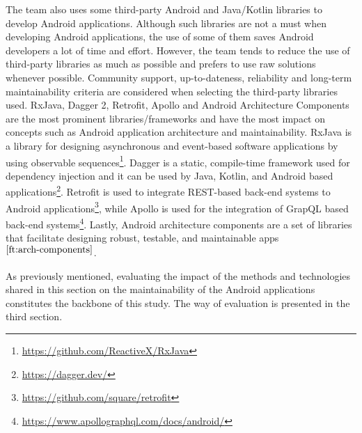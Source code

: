 The team also uses some third-party Android and Java/Kotlin libraries to develop Android applications. Although such libraries are not a must when developing Android applications, the use of some of them saves Android developers a lot of time and effort. However, the team tends to reduce the use of third-party libraries as much as possible and prefers to use raw solutions whenever possible. Community support, up-to-dateness, reliability and long-term maintainability criteria are considered when selecting the third-party libraries used. RxJava, Dagger 2, Retrofit, Apollo and Android Architecture Components are the most prominent libraries/frameworks and have the most impact on concepts such as Android application architecture and maintainability. RxJava is a library for designing asynchronous and event-based software applications by using observable sequences\footnote{\url{https://github.com/ReactiveX/RxJava}}. Dagger is a static, compile-time framework used for dependency injection and it can be used by Java, Kotlin, and Android based applications\footnote{\url{https://dagger.dev/}}. Retrofit is used to integrate REST-based back-end systems to Android applications\footnote{\url{https://github.com/square/retrofit}}, while Apollo is used for the integration of GrapQL based back-end systems\footnote{\url{https://www.apollographql.com/docs/android/}}. Lastly, Android architecture components are a set of libraries that facilitate designing robust, testable, and maintainable apps$^{\ref{ft:arch-components}}$. 

As previously mentioned, evaluating the impact of the methods and technologies shared in this section on the maintainability of the Android applications constitutes the backbone of this study. The way of evaluation is presented in the third section.